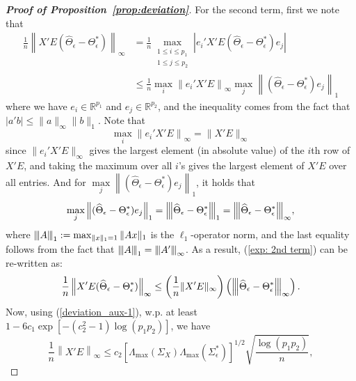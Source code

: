 \begin{proof}[\textbf{Proof of Proposition~\ref{prop:deviation}}]
For the second term, first we note that 
\begin{equation}\label{exp: 2nd term}
\begin{split}
\frac{1}{n}\left\|X'E (\widehat{\Theta}_\epsilon-\Theta_\epsilon^*)\right\|_\infty & = \frac{1}{n}\max\limits_{\substack{1\leq i\leq p_1\\ 1\leq j\leq p_2}} \left|e_i'X'E (\widehat{\Theta}_\epsilon-\Theta_\epsilon^*) e_j\right| \\
& \leq \frac{1}{n}\max\limits_{i} \left\|e_i'X'E \right\|_\infty \max\limits_j \left\| (\widehat{\Theta}_\epsilon-\Theta^*_\epsilon) e_j\right\|_1
\end{split}
\end{equation}
where we have $e_i\in\mathbb{R}^{p_1}$ and $e_j\in\mathbb{R}^{p_2}$, and the inequality comes from the fact that $|a'b|\leq \|a\|_\infty \|b\|_1$. Note that 
\begin{equation*}
\max\limits_{i} \left\|e_i'X'E \right\|_\infty = \|X'E\|_\infty
\end{equation*}
since $\|e_i'X'E \|_\infty$ gives the largest element (in absolute value) of the $i$th row of $X'E$, and taking the maximum over all $i$'s gives the largest element of $X'E$ over all entries. And for $\max\limits_j \left\| (\widehat{\Theta}_\epsilon-\Theta_\epsilon^*) e_j\right\|_1$, it holds that 
\begin{equation*}
\max\limits_j \left\| (\widehat{\Theta}_\epsilon-\Theta_\epsilon^*) e_j\right\|_1 = {\left\vert\kern-0.25ex\left\vert\kern-0.25ex\left\vert \widehat{\Theta}_\epsilon-\Theta_\epsilon^* \right\vert\kern-0.25ex\right\vert\kern-0.25ex\right\vert}_1 = {\left\vert\kern-0.25ex\left\vert\kern-0.25ex\left\vert \widehat{\Theta}_\epsilon-\Theta_\epsilon^* \right\vert\kern-0.25ex\right\vert\kern-0.25ex\right\vert}_\infty,
\end{equation*}
where ${\left\vert\kern-0.25ex\left\vert\kern-0.25ex\left\vert A \right\vert\kern-0.25ex\right\vert\kern-0.25ex\right\vert}_1 :=\max_{\|x\|_1=1}\|Ax\|_1$ is the $\ell_1$-operator norm, and the last equality follows from the fact that ${\left\vert\kern-0.25ex\left\vert\kern-0.25ex\left\vert A \right\vert\kern-0.25ex\right\vert\kern-0.25ex\right\vert}_1={\left\vert\kern-0.25ex\left\vert\kern-0.25ex\left\vert A' \right\vert\kern-0.25ex\right\vert\kern-0.25ex\right\vert}_\infty$. As a result,  (\ref{exp: 2nd term}) can be re-written as:
\begin{equation}\label{term2simplified}
\frac{1}{n}\left\|X'E (\widehat{\Theta}_\epsilon-\Theta_\epsilon^*)\right\|_\infty\leq \left(\frac{1}{n}\|X'E\|_\infty\right) \left( {\left\vert\kern-0.25ex\left\vert\kern-0.25ex\left\vert \widehat{\Theta}_\epsilon-\Theta_\epsilon^* \right\vert\kern-0.25ex\right\vert\kern-0.25ex\right\vert}_\infty\right).
\end{equation}
Now, using (\ref{deviation_aux-1}), w.p. at least $1-6c_1\exp[-(c_2^2-1)\log (p_1p_2)]$, we have 
\begin{equation*}
\frac{1}{n}\left\|X'E\right\|_\infty \leq c_2\left[\Lambda_{\max}(\Sigma_X)\Lambda_{\max}(\Sigma^*_\epsilon)\right]^{1/2} \sqrt{\frac{\log (p_1p_2)}{n}},
\end{equation*}

\end{proof}
